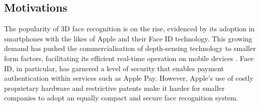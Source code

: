 \documentclass{mpaper}
\begin{document}
\subsection{Motivations}
The popularity of 3D face recognition is on the rise, evidenced by its adoption in smartphones with the likes of Apple and their Face ID \cite{apple-faceid} technology. This growing demand has pushed the commercialisation of depth-sensing technology to smaller form factors, facilitating its efficient real-time operation on mobile devices \cite{soumya2023recent}. Face ID, in particular, has garnered a level of security that enables payment authentication within services such as Apple Pay. However, Apple's use of costly proprietary hardware and restrictive patents make it harder for smaller companies to adopt an equally compact and secure face recognition system.
\end{document}
